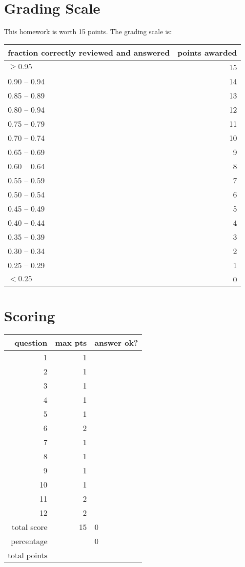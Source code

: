 \documentclass[11pt]{article}
\begin{document}
\section{Grading Scale}
\label{sec:org31ff97e}

This homework is worth 15 points.  The grading
scale is:

\begin{center}
\begin{tabular}{lr}
fraction correctly reviewed and answered & points awarded\\
\hline
\(\ge 0.95\) & 15\\
0.90 -- 0.94 & 14\\
0.85 -- 0.89 & 13\\
0.80 -- 0.94 & 12\\
0.75 -- 0.79 & 11\\
0.70 -- 0.74 & 10\\
0.65 -- 0.69 & 9\\
0.60 -- 0.64 & 8\\
0.55 -- 0.59 & 7\\
0.50 -- 0.54 & 6\\
0.45 -- 0.49 & 5\\
0.40 -- 0.44 & 4\\
0.35 -- 0.39 & 3\\
0.30 -- 0.34 & 2\\
0.25 -- 0.29 & 1\\
\(< 0.25\) & 0\\
\end{tabular}
\end{center}
\section{Scoring}
\label{sec:org2f18251}


\begin{center}
\begin{tabular}{rrl}
question & max pts & answer ok?\\
\hline
1 & 1 & \\
2 & 1 & \\
3 & 1 & \\
4 & 1 & \\
5 & 1 & \\
6 & 2 & \\
7 & 1 & \\
8 & 1 & \\
9 & 1 & \\
10 & 1 & \\
11 & 2 & \\
12 & 2 & \\
\hline
total score & 15 & 0\\
percentage &  & 0\\
total points &  & \\
\end{tabular}
\end{center}
\end{document}
